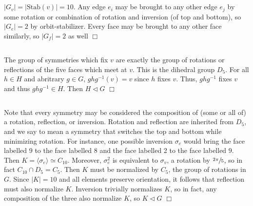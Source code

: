\documentclass{article}
\begin{document}
\subsection{}
$|G_v| = |\mathrm{Stab}(v)| = 10$. Any edge $e_i$ may be brought to any other edge $e_j$ by some rotation or combination of rotation and inversion (of top and bottom), so $|G_e| = 2$ by orbit-stabilizer. Every face may be brought to any other face similarly, so $|G_f| = 2$ as well $\Box$

\subsection{}
The group of symmetries which fix $v$ are exactly the group of rotations or reflections of the five faces which meet at $v$. This is the dihedral group $D_5$. For all $h \in H$ and abritrary $g \in G$, $ghg^{-1}(v) = v$ since $h$ fixes $v$. Thus, $ghg^{-1}$ fixes $v$ and thus $ghg^{-1} \in H$. Then $H \lhd G$ $\Box$

\subsection{}
Note that every symmetry may be considered the composition of (some or all of) a rotation, reflection, or inversion. Rotation and reflection are inherited from $D_5$, and we say  to mean a symmetry that switches the top and bottom while minimizing rotation. For instance, one possible inversion $\sigma_e$ would bring the face labelled 9 to the face labelled 8 and the face labelled 2 to the face labelled 9. Then $K = \langle \sigma_e \rangle \simeq C_{10}$. Moreover, $\sigma_e^2$ is equivalent to $\sigma_v$, a rotation by $\sfrac{2\pi}{5}$, so in fact $C_{10} \cap D_5 = C_5$. Then $K$ must be normalized by $C_5$, the group of rotations in $G$. Since $|K| = 10$ and all elements preserve orientation, it follows that reflection must also normalize $K$. Inversion trivially normalizes $K$, so in fact, any composition of the three also normalize $K$, so $K \lhd G$ $\Box$
\end{document}
